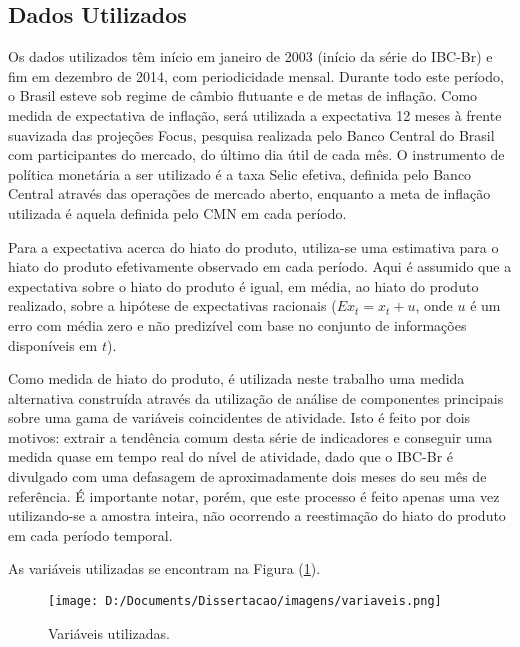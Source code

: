 \documentclass[
	article,			%
	11pt,				%
	oneside,			%
	a4paper,			%
	english,			%
	brazil,				%
	]{abntex2}
\begin{document}
	\subsection{Dados Utilizados}
	Os dados utilizados têm início em janeiro de 2003 (início da série do IBC-Br) e fim em dezembro de 2014, com periodicidade mensal. Durante todo este período, o Brasil esteve sob regime de câmbio flutuante e de metas de inflação. Como medida de expectativa de inflação, será utilizada a expectativa 12 meses à frente suavizada das projeções Focus, pesquisa realizada pelo Banco Central do Brasil com participantes do mercado, do último dia útil de cada mês. O instrumento de política monetária a ser utilizado é a taxa Selic efetiva, definida pelo Banco Central através das operações de mercado aberto, enquanto a meta de inflação utilizada é aquela definida pelo CMN em cada período.
	
	Para a expectativa acerca do hiato do produto, utiliza-se uma estimativa para o hiato do produto efetivamente observado em cada período. Aqui é assumido que a expectativa sobre o hiato do produto é igual, em média, ao hiato do produto realizado, sobre a hipótese de expectativas racionais ($Ex_t = x_t + u$, onde $u$ é um erro com média zero e não predizível com base no conjunto de informações disponíveis em $t$).
	
	Como medida de hiato do produto, é utilizada neste trabalho uma medida alternativa construída através da utilização de análise de componentes principais sobre uma gama de variáveis coincidentes de atividade. Isto é feito por dois motivos: extrair a tendência comum desta série de indicadores e conseguir uma medida quase em tempo real do nível de atividade, dado que o IBC-Br é divulgado com uma defasagem de aproximadamente dois meses do seu mês de referência. É importante notar, porém, que este processo é feito apenas uma vez utilizando-se a amostra inteira, não ocorrendo a reestimação do hiato do produto em cada período temporal.
	
	As variáveis utilizadas se encontram na Figura (\ref{fig:variaveis}).
	
	\hfill \break
	\hfill \break
	\hfill \break
	\hfill \break
	\hfill \break
	\hfill \break
	\hfill \break
	\hfill \break
	\hfill \break
	\hfill \break
	\hfill \break
	\hfill \break
	\hfill \break
	\hfill \break
	\hfill \break
	\hfill \break
	
	\begin{figure}[!h]
	\texttt{[image: D:/Documents/Dissertacao/imagens/variaveis.png]}
	\caption{Variáveis utilizadas.}
	\label{fig:variaveis}
	\end{figure}
	
\end{document}

